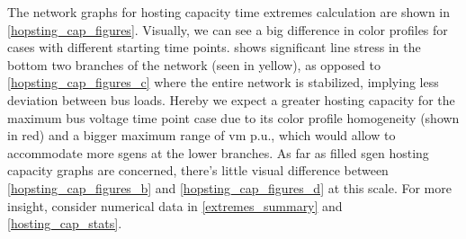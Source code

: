 \documentclass[a4paper,10pt]{report}
\begin{document}
The network graphs for hosting capacity time extremes calculation are shown in \cref{hopsting_cap_figures}. Visually, we can see a big difference in color profiles for cases with different starting time points.  shows significant line stress in the bottom two branches of the network (seen in yellow), as opposed to \cref{hopsting_cap_figures_c} where the entire network is stabilized, implying less deviation between bus loads. Hereby we expect a greater hosting capacity for the maximum bus voltage time point case due to its color profile homogeneity (shown in red) and a bigger maximum range of vm p.u., which would allow to accommodate more sgens at the lower branches. As far as filled sgen hosting capacity graphs are concerned, there's little visual difference between \cref{hopsting_cap_figures_b} and \cref{hopsting_cap_figures_d} at this scale. For more insight, consider numerical data in \cref{extremes_summary} and \cref{hosting_cap_stats}.
\end{document}
